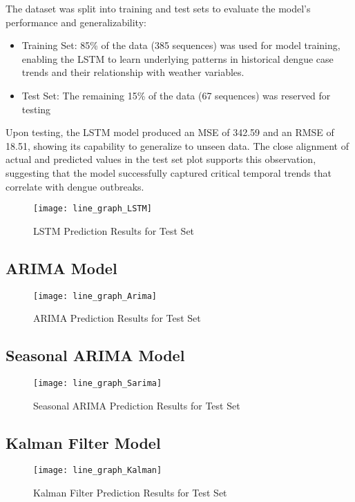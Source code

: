 The dataset was split into training and test sets to evaluate the model’s performance and generalizability:
\begin{itemize}
	\item Training Set: 85\% of the data (385 sequences) was used for model training, enabling the LSTM to learn underlying patterns in historical dengue case trends and their relationship with weather variables.
	\item Test Set: The remaining 15\% of the data (67 sequences) was reserved for testing
\end{itemize}

Upon testing, the LSTM model produced an MSE of 342.59 and an RMSE of 18.51, showing its capability to generalize to unseen data. The close alignment of actual and predicted values in the test set plot supports this observation, suggesting that the model successfully captured critical temporal trends that correlate with dengue outbreaks.

\begin{figure}[H]
	\centering
	\texttt{[image: line\_graph\_LSTM]}
	\caption{LSTM Prediction Results for Test Set}
	\label{fig:LSTM_result}
\end{figure}

\subsection{ARIMA Model}

\begin{figure}[H]
	\centering
	\texttt{[image: line\_graph\_Arima]}
	\caption{ARIMA Prediction Results for Test Set}
	\label{fig:Arima_result}
\end{figure}

\subsection{Seasonal ARIMA Model}

\begin{figure}[H]
	\centering
	\texttt{[image: line\_graph\_Sarima]}
	\caption{Seasonal ARIMA Prediction Results for Test Set}
	\label{fig:Sarima_result}
\end{figure}

\subsection{Kalman Filter Model}

\begin{figure}[H]
	\centering
	\texttt{[image: line\_graph\_Kalman]}
	\caption{Kalman Filter Prediction Results for Test Set}
	\label{fig:Kalman_result}
\end{figure}

